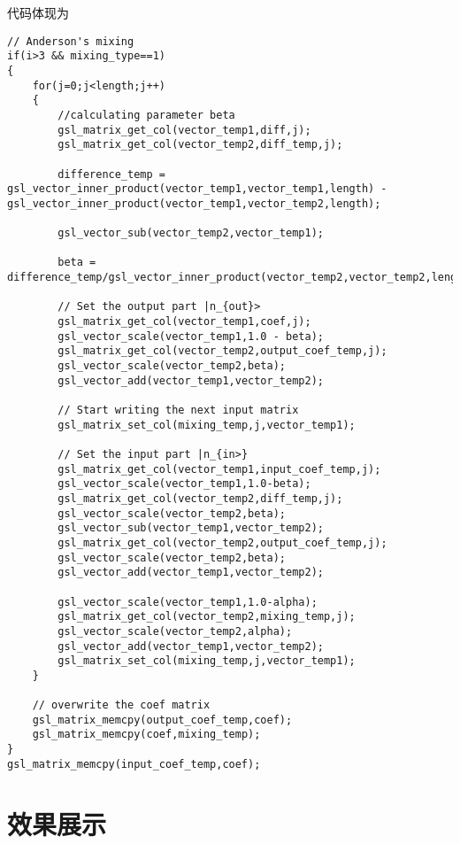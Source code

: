 \documentclass[12pt,a4paper,openany,twoside]{article}
\numberwithin{equation}{section}
\begin{document}
                代码体现为
                \begin{lstlisting}
// Anderson's mixing
if(i>3 && mixing_type==1)
{
    for(j=0;j<length;j++)
    {
        //calculating parameter beta
        gsl_matrix_get_col(vector_temp1,diff,j);
        gsl_matrix_get_col(vector_temp2,diff_temp,j);

        difference_temp = gsl_vector_inner_product(vector_temp1,vector_temp1,length) - gsl_vector_inner_product(vector_temp1,vector_temp2,length);

        gsl_vector_sub(vector_temp2,vector_temp1);

        beta = difference_temp/gsl_vector_inner_product(vector_temp2,vector_temp2,length);

        // Set the output part |n_{out}>
        gsl_matrix_get_col(vector_temp1,coef,j);
        gsl_vector_scale(vector_temp1,1.0 - beta);
        gsl_matrix_get_col(vector_temp2,output_coef_temp,j);
        gsl_vector_scale(vector_temp2,beta);
        gsl_vector_add(vector_temp1,vector_temp2);

        // Start writing the next input matrix
        gsl_matrix_set_col(mixing_temp,j,vector_temp1);

        // Set the input part |n_{in>}
        gsl_matrix_get_col(vector_temp1,input_coef_temp,j);
        gsl_vector_scale(vector_temp1,1.0-beta);
        gsl_matrix_get_col(vector_temp2,diff_temp,j);
        gsl_vector_scale(vector_temp2,beta);
        gsl_vector_sub(vector_temp1,vector_temp2);
        gsl_matrix_get_col(vector_temp2,output_coef_temp,j);
        gsl_vector_scale(vector_temp2,beta);
        gsl_vector_add(vector_temp1,vector_temp2);                

        gsl_vector_scale(vector_temp1,1.0-alpha);
        gsl_matrix_get_col(vector_temp2,mixing_temp,j);
        gsl_vector_scale(vector_temp2,alpha);
        gsl_vector_add(vector_temp1,vector_temp2);
        gsl_matrix_set_col(mixing_temp,j,vector_temp1);
    }

    // overwrite the coef matrix
    gsl_matrix_memcpy(output_coef_temp,coef);
    gsl_matrix_memcpy(coef,mixing_temp);
}     
gsl_matrix_memcpy(input_coef_temp,coef);  
                \end{lstlisting}

\section{效果展示}
\end{document}
